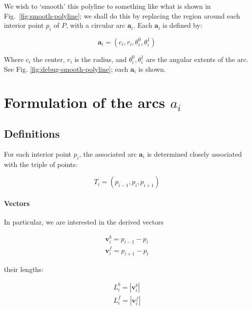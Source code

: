 \documentclass{article}
\begin{document}
We wish to `smooth' this polyline to something like what is shown in Fig.~\ref{fig:smooth-polyline}; we shall do this by replacing the region around each interior point $p_{i}$ of $P$, with a circular arc $\mathbf{a}_{i}$.  Each $\mathbf{a}_{i}$ is defined by:

\begin{equation}
  \label{eq:circ-def}
\mathbf{a}_i=\left(
  c_{i},
  r_{i},
  \theta^{0}_{i},
  \theta^{1}_{i}
\right)
\end{equation}

Where $c_{i}$ the center, $r_{i}$ is the radius, and $\theta^{0}_{i}, \theta^{1}_{i}$ are the angular extents of the arc.  See Fig. \ref{fig:debug-smooth-polyline}; each $\mathbf{a}_{i}$ is shown.

\section{Formulation of the arcs $a_{i}$}

\subsection{Definitions}

For each interior point $p_{i}$, the associated arc $\mathbf{a}_{i}$ is determined closely associated with the triple of points:

\begin{equation}
  \label{eq:arc-triple}
  T_{i} = \left(p_{i-1}, p_{i}, p_{i+1}\right)
\end{equation}

\paragraph{Vectors}

In particular, we are interested in the derived vectors

\begin{equation}
  \label{eq:vectors}
  \begin{split}
  \mathbf{v}^{b}_{i} = p_{i-1} - p_{i}\\
  \mathbf{v}^{f}_{i} = p_{i+1} - p_{i}
  \end{split}
\end{equation}

their lengths:

\begin{equation}
  \label{eq:vector-lengths}
  \begin{split}
    L^{b}_{i} = |\mathbf{v}^{b}_{i}|\\
    L^{f}_{i} = |\mathbf{v}^{f}_{i}|
  \end{split}
\end{equation}
\end{document}
